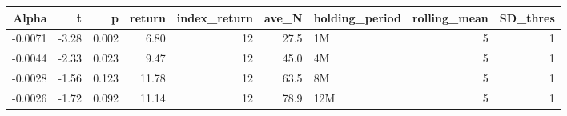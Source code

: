 \begin{table}[ht]
\centering
\begin{tabular}{rrrrrrlrr}
  \hline
Alpha & t & p & return & index\_return & ave\_N & holding\_period & rolling\_mean & SD\_thres \\ 
  \hline
-0.0071 & -3.28 & 0.002 & 6.80 & 12 & 27.5 & 1M &  5 &  1 \\ 
  -0.0044 & -2.33 & 0.023 & 9.47 & 12 & 45.0 & 4M &  5 &  1 \\ 
  -0.0028 & -1.56 & 0.123 & 11.78 & 12 & 63.5 & 8M &  5 &  1 \\ 
  -0.0026 & -1.72 & 0.092 & 11.14 & 12 & 78.9 & 12M &  5 &  1 \\ 
   \hline
\end{tabular}
\end{table}

